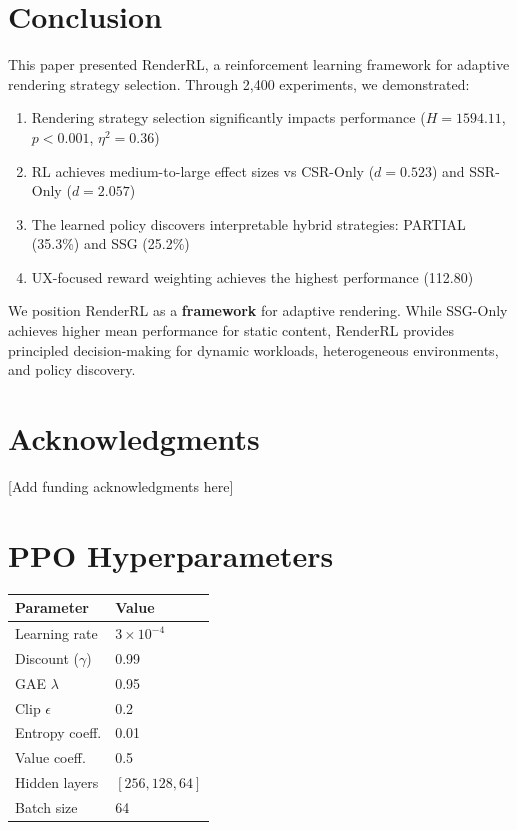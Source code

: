 \documentclass[10pt,twocolumn]{article}
\newcommand{\method}{RenderRL}
\begin{document}
\section{Conclusion}
\label{sec:conclusion}

This paper presented \method{}, a reinforcement learning framework for adaptive rendering strategy selection. Through 2,400 experiments, we demonstrated:

\begin{enumerate}[nosep]
\item Rendering strategy selection significantly impacts performance ($H = 1594.11$, $p < 0.001$, $\eta^2 = 0.36$)
\item RL achieves medium-to-large effect sizes vs CSR-Only ($d=0.523$) and SSR-Only ($d=2.057$)
\item The learned policy discovers interpretable hybrid strategies: PARTIAL (35.3\%) and SSG (25.2\%)
\item UX-focused reward weighting achieves the highest performance (112.80)
\end{enumerate}

We position \method{} as a \textbf{framework} for adaptive rendering. While SSG-Only achieves higher mean performance for static content, \method{} provides principled decision-making for dynamic workloads, heterogeneous environments, and policy discovery.

\section*{Acknowledgments}

[Add funding acknowledgments here]




\appendix

\section{PPO Hyperparameters}

\begin{table}[h]
\centering
\begin{tabular}{ll}
\toprule
\textbf{Parameter} & \textbf{Value} \\
\midrule
Learning rate & $3 \times 10^{-4}$ \\
Discount ($\gamma$) & 0.99 \\
GAE $\lambda$ & 0.95 \\
Clip $\epsilon$ & 0.2 \\
Entropy coeff. & 0.01 \\
Value coeff. & 0.5 \\
Hidden layers & $[256, 128, 64]$ \\
Batch size & 64 \\
\bottomrule
\end{tabular}
\end{table}
\end{document}
